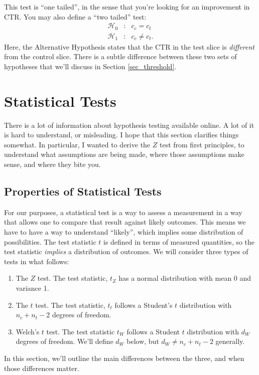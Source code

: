 \documentclass{article}
\numberwithin{equation}{section}
\begin{document}
This test is ``one tailed'', in the sense that you're looking for an improvement in CTR. You may also define a ``two tailed'' test:
\begin{eqnarray}
	\mathcal{H}_0 &:& c_c = c_t \\
	\mathcal{H}_1 &:& c_c \neq c_t.
\end{eqnarray}
Here, the Alternative Hypothesis states that the CTR in the test slice is \textit{different} from the control slice. There is a subtle difference between these two sets of hypotheses that we'll discuss in Section \ref{sec_threshold}.

\section{Statistical Tests \label{sec_stat_tests}}

There is a lot of information about hypothesis testing available online. A lot of it is hard to understand, or misleading. I hope that this section clarifies things somewhat. In particular, I wanted to derive the $Z$ test from first principles, to understand what assumptions are being made, where those assumptions make sense, and where they bite you.

\subsection{Properties of Statistical Tests}

For our purposes, a statistical test is a way to assess a measurement in a way that allows one to compare that result against likely outcomes. This means we have to have a way to understand ``likely'', which implies some distribution of possibilities. The test statistic $t$ is defined in terms of measured quantities, so the test statistic \textit{implies} a distribution of outcomes. We will consider three types of tests in what follows:
\begin{enumerate}
	\item The $Z$ test. The test statistic, $t_Z$ has a normal distribution with mean 0 and variance 1.
	\item The $t$ test. The test statistic, $t_t$ follows a Student's $t$ distribution with $n_c + n_t - 2$ degrees of freedom.
	\item Welch's $t$ test. The test statistic $t_W$ follows a Student $t$ distribution with $d_W$ degrees of freedom. We'll define $d_W$ below, but $d_W \neq n_c + n_t - 2$ generally.
\end{enumerate}
In this section, we'll outline the main differences between the three, and when those differences matter.
\end{document}
